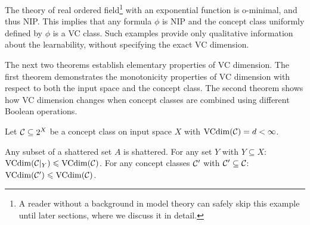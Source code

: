 \begin{example}[Hard]
    The theory of real ordered field\footnote{A reader without a background in model theory can safely skip this example until later sections, where we discuss it in detail.} with an exponential function is o-minimal, and thus NIP. This implies that any formula $\phi$ is NIP and the concept class uniformly defined by $\phi$ is a VC class. Such examples provide only qualitative information about the learnability, without specifying the exact VC dimension.
\end{example}


The next two theorems establish elementary properties of VC dimension. The first theorem demonstrates the monotonicity properties of VC dimension with respect to both the input space and the concept class. 
The second theorem shows how VC dimension changes when concept classes are combined using different Boolean operations. 

\begin{theorem}
\label{thm:VCbasic1}
Let $\mathcal{C} \subseteq 2^X$ be a concept class on input space $X$ with $\operatorname{VCdim}(\mathcal{C})=d<\infty$.
\begin{outline}
    \1[(1)] Any subset of a shattered set $A$ is shattered.
    \1[(2)] For any set $Y$ with $Y \subseteq X$:
    $\operatorname{VCdim}(\mathcal{C}|_Y) \leqslant \operatorname{VCdim}(\mathcal{C})$.
    \1[(3)] For any concept classes $\mathcal{C}'$ with $\mathcal{C}' \subseteq \mathcal{C}$:
    $\operatorname{VCdim}(\mathcal{C}') \leqslant \operatorname{VCdim}(\mathcal{C})$.
\end{outline}
\end{theorem}

